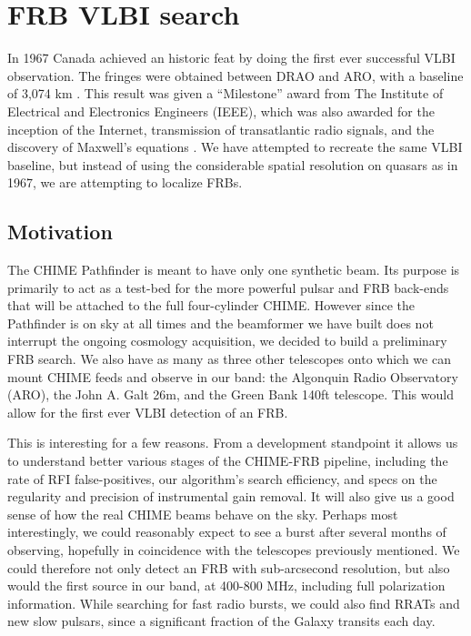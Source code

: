 \section{FRB VLBI search}
\label{vlbi_frb}

In 1967 Canada achieved an historic feat by doing 
the first ever successful VLBI observation. The fringes were 
obtained between DRAO and ARO, with a baseline of 3,074 km \citep{1967Natur.215...38B}. 
This result was given a ``Milestone'' award from 
The Institute of Electrical and Electronics Engineers (IEEE), 
which was also awarded for the inception of the Internet, transmission 
of transatlantic radio signals, and the discovery of Maxwell's equations \citep{IEEEmilestone}. 
We have attempted to recreate the same VLBI baseline, but instead of 
using the considerable spatial resolution on quasars as in 1967, 
we are attempting to localize FRBs. 


\subsection{Motivation}

The CHIME Pathfinder is meant to have only one synthetic beam. 
Its purpose is primarily to act as a test-bed for the more powerful 
pulsar and FRB back-ends that will be attached to the 
full four-cylinder CHIME. However since the Pathfinder is on 
sky at all times and the beamformer we have built does not 
interrupt the ongoing cosmology acquisition, we decided to 
build a preliminary FRB search. We also have as many as three 
other telescopes onto which we can mount 
CHIME feeds and observe in our band: the Algonquin Radio Observatory (ARO), 
the John A. Galt 26m, and the Green Bank 140ft telescope. This would
allow for the first ever VLBI detection of an FRB. 

This is interesting for a few reasons. From a development 
standpoint it allows us to understand better various stages of the 
CHIME-FRB pipeline, including the rate of 
RFI false-positives, our algorithm's search 
efficiency, and specs on the regularity and precision of instrumental 
gain removal. It will also give us a good sense of how the real CHIME 
beams behave on the sky. Perhaps most interestingly, 
we could reasonably expect to see a burst after several months of 
observing, hopefully in coincidence with the telescopes previously mentioned. 
We could therefore not only detect an FRB with sub-arcsecond resolution,
but also would the first source in our band, at 400-800 MHz, 
including full polarization information. While searching 
for fast radio bursts, we could also find RRATs and new slow pulsars, since 
a significant fraction of the Galaxy transits each day.

